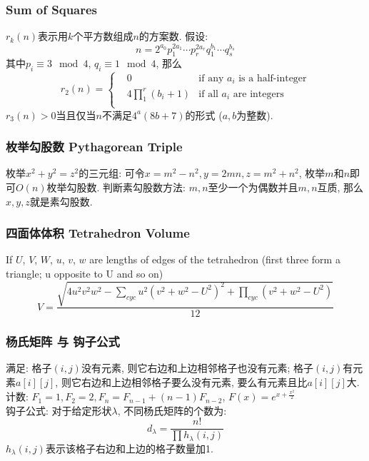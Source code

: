 \begin{small}
\subsubsection{Sum of Squares}
$r_k(n)$表示用$k$个平方数组成$n$的方案数. 假设: 
\[n=2^{a_0}p_1^{2a_1}\cdots p_r^{2a_r}q_1^{b_1}\cdots q_s^{b_s}\]
其中$p_i\equiv 3 \mod 4$, $q_i\equiv 1 \mod 4$, 那么
\[r_2(n)=\left\{\begin{aligned}
& 0 & \text{if any }a_i\text{ is a half-integer}\\
& 4\prod_1^r(b_i+1) & \text{if all }a_i\text{ are integers}\\
\end{aligned}\right.\]
$r_3(n)>0$当且仅当$n$不满足$4^a(8b+7)$的形式 ($a,b$为整数).
\subsubsection{枚举勾股数 Pythagorean Triple}
枚举$x^2+y^2=z^2$的三元组: 可令$x=m^2-n^2,y=2mn,z=m^2+n^2$, 枚举$m$和$n$即可$O(n)$枚举勾股数. 判断素勾股数方法: $m,n$至少一个为偶数并且$m,n$互质, 那么$x,y,z$就是素勾股数.
\subsubsection{四面体体积 Tetrahedron Volume}
If $U$, $V$, $W$, $u$, $v$, $w$ are lengths of edges of the tetrahedron (first three form a triangle; u opposite to U and so on)
\[ V = \frac{\sqrt{ 4u^2v^2w^2 - \sum_{cyc}{u^2(v^2+w^2-U^2)^2} + \prod_{cyc}{(v^2+w^2-U^2)} }}{12} \]
\subsubsection{杨氏矩阵 与 钩子公式}
满足: 格子$(i,j)$没有元素, 则它右边和上边相邻格子也没有元素; 格子$(i,j)$有元素$a[i][j]$, 则它右边和上边相邻格子要么没有元素, 要么有元素且比$a[i][j]$大.\\
计数: $F_1=1,F_2=2,F_n=F_{n-1}+(n-1)F_{n-2}$, $F(x)=e^{x+\frac{x^2}{2}}$\\
钩子公式: 对于给定形状$\lambda$, 不同杨氏矩阵的个数为:
\[d_\lambda=\frac{n!}{\prod h_\lambda(i,j)}\]
$h_\lambda(i,j)$表示该格子右边和上边的格子数量加1. 


\end{small}
